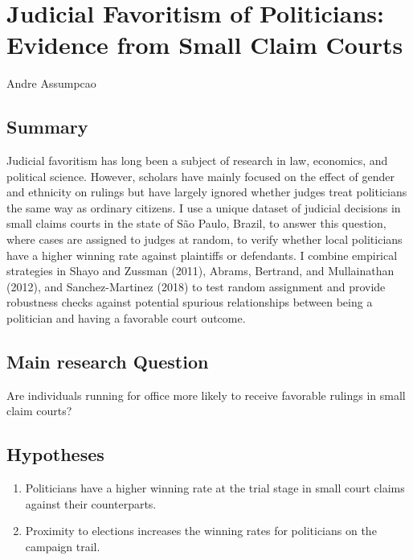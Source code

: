 \documentclass[]{article}
\title{}
\author{}
\date{}
\begin{document}
\hypertarget{title}{%
\section{Judicial Favoritism of Politicians: Evidence from Small Claim
Courts}\label{title}}

Andre Assumpcao

\hypertarget{summary}{%
\subsection{Summary}\label{summary}}

Judicial favoritism has long been a subject of research in law,
economics, and political science. However, scholars have mainly focused
on the effect of gender and ethnicity on rulings but have largely
ignored whether judges treat politicians the same way as ordinary
citizens. I use a unique dataset of judicial decisions in small claims
courts in the state of São Paulo, Brazil, to answer this question, where
cases are assigned to judges at random, to verify whether local
politicians have a higher winning rate against plaintiffs or defendants.
I combine empirical strategies in Shayo and Zussman (2011), Abrams,
Bertrand, and Mullainathan (2012), and Sanchez-Martinez (2018) to test
random assignment and provide robustness checks against potential
spurious relationships between being a politician and having a favorable
court outcome.

\hypertarget{main-research-question}{%
\subsection{Main research Question}\label{main-research-question}}

Are individuals running for office more likely to receive favorable
rulings in small claim courts?

\hypertarget{hypotheses}{%
\subsection{Hypotheses}\label{hypotheses}}

\begin{enumerate}
\item
  Politicians have a higher winning rate at the trial stage in small
  court claims against their counterparts.
\item
  Proximity to elections increases the winning rates for politicians on
  the campaign trail.
\end{enumerate}
\end{document}

